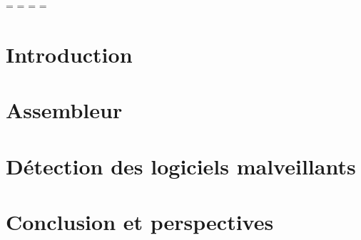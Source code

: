
\usepackage[disable]{todonotes}


\OddHead={{\leftmark\rightmark}{\hfil\slshape\rightmark}}
\EvenHead={{\leftmark}{{\slshape\leftmark}\hfil}}
\OddFoot={\hfil\thepage}
\EvenFoot={\thepage\hfil}
\pagestyle{ThesisHeadingsII}

\mainmatter 

% 

\DontFrameThisInToc
\chapter*{Introduction\label{chap:introduction}}


\DontFrameThisInToc
\chapter{Assembleur\label{chap:assembleur}}


\DontFrameThisInToc
\chapter{Détection des logiciels malveillants\label{chap:detection}}



\DontFrameThisInToc
\chapter*{Conclusion et perspectives\label{chap:conclusion}}


% 
% 
% 
\printbibliography



